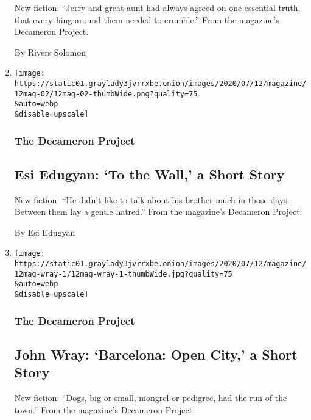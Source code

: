 \begin{enumerate}
  New fiction: ``Jerry and great-aunt had always agreed on one essential
  truth, that everything around them needed to crumble.'' From the
  magazine's Decameron Project.

  By Rivers Solomon
\item
  \href{/interactive/2020/07/07/magazine/esi-edugyan-short-story.html}{}

  \texttt{[image: https://static01.graylady3jvrrxbe.onion/images/2020/07/12/magazine/12mag-02/12mag-02-thumbWide.png?quality=75\\\&auto=webp\\\&disable=upscale]}

  \hypertarget{the-decameron-project-13}{%
  \subsubsection{The Decameron Project}\label{the-decameron-project-13}}

  \hypertarget{esi-edugyan-to-the-wall-a-short-story}{%
  \subsection{Esi Edugyan: `To the Wall,' a Short
  Story}\label{esi-edugyan-to-the-wall-a-short-story}}

  New fiction: ``He didn't like to talk about his brother much in those
  days. Between them lay a gentle hatred.'' From the magazine's
  Decameron Project.

  By Esi Edugyan
\item
  \href{/interactive/2020/07/07/magazine/john-wray-short-story.html}{}

  \texttt{[image: https://static01.graylady3jvrrxbe.onion/images/2020/07/12/magazine/12mag-wray-1/12mag-wray-1-thumbWide.jpg?quality=75\\\&auto=webp\\\&disable=upscale]}

  \hypertarget{the-decameron-project-14}{%
  \subsubsection{The Decameron Project}\label{the-decameron-project-14}}

  \hypertarget{john-wray-barcelona-open-city-a-short-story}{%
  \subsection{John Wray: `Barcelona: Open City,' a Short
  Story}\label{john-wray-barcelona-open-city-a-short-story}}

  New fiction: ``Dogs, big or small, mongrel or pedigree, had the run of
  the town.'' From the magazine's Decameron Project.


\end{enumerate}

